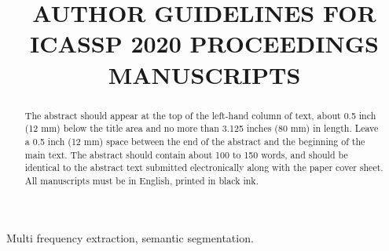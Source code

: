 \documentclass{article}
\title{AUTHOR GUIDELINES FOR ICASSP 2020 PROCEEDINGS MANUSCRIPTS}
\begin{document}
%
\maketitle
%
\begin{abstract}
The abstract should appear at the top of the left-hand column of text, about
0.5 inch (12 mm) below the title area and no more than 3.125 inches (80 mm) in
length.  Leave a 0.5 inch (12 mm) space between the end of the abstract and the
beginning of the main text.  The abstract should contain about 100 to 150
words, and should be identical to the abstract text submitted electronically
along with the paper cover sheet.  All manuscripts must be in English, printed
in black ink.
\end{abstract}
%
\begin{keywords}
Multi frequency extraction, semantic segmentation.
\end{keywords}
%
\end{document}
